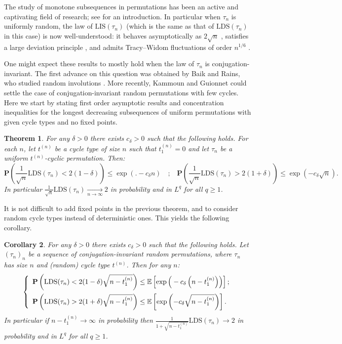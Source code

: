 \documentclass{article}
\newtheorem{theorem}{Theorem}[section]
\newtheorem{cor}[theorem]{Corollary}
\theoremstyle{remark}
\newcommand{\cv}[2]{\underset{#1\to#2}{\longrightarrow}}
\newcommand{\mean}[1]{\mathbb{E}\left[#1\right]}
\newcommand{\prob}[1]{\mathbf{P}\left(#1\right)}
\def\LIS{\mathrm{LIS}}
\def\LDS{\mathrm{LDS}}
\begin{document}
The study of monotone subsequences in permutations has been an active and captivating field of research; see \cite{R15} for an introduction.
In particular when $\tau_n$ is uniformly random, the law of $\LIS(\tau_n)$ (which is the same as that of $\LDS(\tau_n)$ in this case) is now well-understood: it behaves asymptotically as $2\sqrt n$ \cite{VK77}, satisfies a large deviation principle \cite{DZ99,S98}, and admits Tracy--Widom fluctuations of order $n^{1/6}$ \cite{BDJ99}.

One might expect these results to mostly hold when the law of $\tau_n$ is conjugation-invariant.
The first advance on this question was obtained by Baik and Rains, who studied random involutions \cite{BR01}.
More recently, Kammoun \cite{K18,K23} and Guionnet \cite{GK23} could settle the case of conjugation-invariant random permutations with few cycles.
Here we start by stating first order asymptotic results and concentration inequalities for the longest decreasing subsequences of uniform permutations with given cycle types and no fixed points.

\begin{theorem}\label{th: LDS t-cyclic}
    For any $\delta>0$ there exists $c_\delta>0$ such that the following holds.
    For each $n$, let $t^{(n)}$ be a cycle type of size $n$ such that $t_1^{(n)}=0$ and let $\tau_n$ be a uniform $t^{(n)}$-cyclic permutation.
    Then:
    \begin{equation*}
        \prob{\frac{1}{\sqrt{n}}\LDS(\tau_n) < 2(1-\delta)} \le \exp\left(\big.-c_\delta n\right)
        \quad\text{;}\quad 
        \prob{\frac{1}{\sqrt{n}}\LDS(\tau_n) > 2(1+\delta)} \le \exp\left(-c_\delta \sqrt{n}\right) .
    \end{equation*}
    In particular $\frac{1}{\sqrt{n}}\LDS(\tau_n)\cv{n}{\infty}2$ in probability and in $L^q$ for all $q\ge1$.
\end{theorem}

It is not difficult to add fixed points in the previous theorem, and to consider random cycle types instead of deterministic ones.
This yields the following corollary.

\begin{cor}\label{cor: LDS conjugation-invariant}
    For any $\delta>0$ there exists $c_\delta>0$ such that the following holds.
    Let $(\tau_n)_n$ be a sequence of conjugation-invariant random permutations, where $\tau_n$ has size $n$ and (random) cycle type $t^{(n)}$.
    Then for any $n$:
    \begin{equation*}
    \left\{
        \begin{array}{ll}
        \prob{\LDS(\tau_n) < 2(1-\delta)\sqrt{n-t_1^{(n)}}} \le \mean{\exp\left(\big.-c_\delta \left(n-t_1^{(n)}\right)\right)} ;\vspace{.5em}\\ 
        \prob{\LDS(\tau_n) > 2(1+\delta)\sqrt{n-t_1^{(n)}}} \le \mean{\exp\left(-c_\delta \sqrt{n-t_1^{(n)}}\right)} .
        \end{array}
    \right.
    \end{equation*}
    In particular if $n-t_1^{(n)}\to\infty$ in probability then $\frac{1}{1+\sqrt{n-t_1^{(n)}}}\LDS(\tau_n) \to 2$ in probability and in $L^q$ for all $q\ge1$.
\end{cor}
\end{document}

